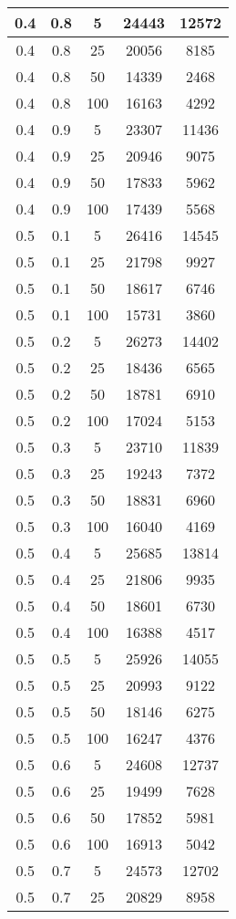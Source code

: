 \begin{appendices}
\begin{longtable}[c]{|c|c|c|c|c|}
	\hline
	0.4& 0.8& 5& 24443&  12572\\
	\hline
	0.4& 0.8& 25& 20056&  8185\\
	\hline
	0.4& 0.8& 50& 14339&  2468\\
	\hline
	0.4& 0.8& 100& 16163&  4292\\
	\hline
	0.4& 0.9& 5& 23307&  11436\\
	\hline
	0.4& 0.9& 25& 20946&  9075\\
	\hline
	0.4& 0.9& 50& 17833&  5962\\
	\hline
	0.4& 0.9& 100& 17439&  5568\\
	\hline
	0.5& 0.1& 5& 26416&  14545\\
	\hline
	0.5& 0.1& 25& 21798&  9927\\
	\hline
	0.5& 0.1& 50& 18617&  6746\\
	\hline
	0.5& 0.1& 100& 15731&  3860\\
	\hline
	0.5& 0.2& 5& 26273&  14402\\
	\hline
	0.5& 0.2& 25& 18436&  6565\\
	\hline
	0.5& 0.2& 50& 18781&  6910\\
	\hline
	0.5& 0.2& 100& 17024&  5153\\
	\hline
	0.5& 0.3& 5& 23710&  11839\\
	\hline
	0.5& 0.3& 25& 19243&  7372\\
	\hline
	0.5& 0.3& 50& 18831&  6960\\
	\hline
	0.5& 0.3& 100& 16040&  4169\\
	\hline
	0.5& 0.4& 5& 25685&  13814\\
	\hline
	0.5& 0.4& 25& 21806&  9935\\
	\hline
	0.5& 0.4& 50& 18601&  6730\\
	\hline
	0.5& 0.4& 100& 16388&  4517\\
	\hline
	0.5& 0.5& 5& 25926&  14055\\
	\hline
	0.5& 0.5& 25& 20993&  9122\\
	\hline
	0.5& 0.5& 50& 18146&  6275\\
	\hline
	0.5& 0.5& 100& 16247&  4376\\
	\hline
	0.5& 0.6& 5& 24608&  12737\\
	\hline
	0.5& 0.6& 25& 19499&  7628\\
	\hline
	0.5& 0.6& 50& 17852&  5981\\
	\hline
	0.5& 0.6& 100& 16913&  5042\\
	\hline
	0.5& 0.7& 5& 24573&  12702\\
	\hline
	0.5& 0.7& 25& 20829&  8958\\

\end{longtable}
\end{appendices}
